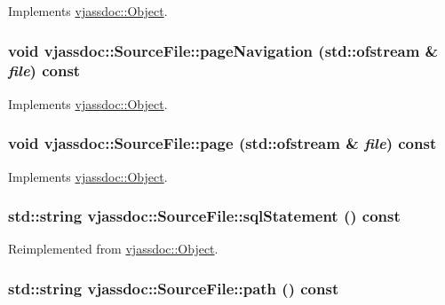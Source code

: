 Implements \hyperlink{classvjassdoc_1_1Object_bd43e77dbe80055f5adda67661dfaca4}{vjassdoc::Object}.\hypertarget{classvjassdoc_1_1SourceFile_b365551c64c03553e8fb1a31d83edaea}{
\subsubsection{\setlength{\rightskip}{0pt plus 5cm}void vjassdoc::SourceFile::pageNavigation (std::ofstream \& {\em file}) const}}
\label{classvjassdoc_1_1SourceFile_b365551c64c03553e8fb1a31d83edaea}




Implements \hyperlink{classvjassdoc_1_1Object_736bbb6719edd8070d8f56c364a2764c}{vjassdoc::Object}.\hypertarget{classvjassdoc_1_1SourceFile_0a4aed2c620f52f3cb114843f674b31c}{
\subsubsection{\setlength{\rightskip}{0pt plus 5cm}void vjassdoc::SourceFile::page (std::ofstream \& {\em file}) const}}
\label{classvjassdoc_1_1SourceFile_0a4aed2c620f52f3cb114843f674b31c}




Implements \hyperlink{classvjassdoc_1_1Object_a0489e38956f3507566b1bc6e3e2c8af}{vjassdoc::Object}.\hypertarget{classvjassdoc_1_1SourceFile_cda6410687f71928eafac94a635c4250}{
\subsubsection{\setlength{\rightskip}{0pt plus 5cm}std::string vjassdoc::SourceFile::sqlStatement () const}}
\label{classvjassdoc_1_1SourceFile_cda6410687f71928eafac94a635c4250}




Reimplemented from \hyperlink{classvjassdoc_1_1Object_4e8ebbb0ce5b0bf91ec847b1e4a9f8fc}{vjassdoc::Object}.\hypertarget{classvjassdoc_1_1SourceFile_4764039ae2d00f6fbdc41186972b5ff9}{
\subsubsection{\setlength{\rightskip}{0pt plus 5cm}std::string vjassdoc::SourceFile::path () const}}
\label{classvjassdoc_1_1SourceFile_4764039ae2d00f6fbdc41186972b5ff9}


